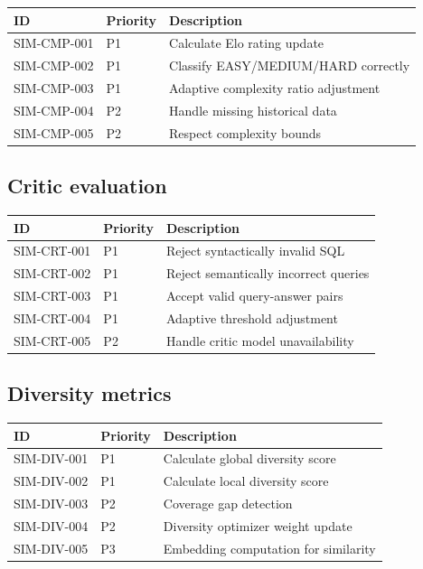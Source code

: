 \begin{tabularx}{\linewidth}{@{}l l X@{}}
\toprule
\textbf{ID} & \textbf{Priority} & \textbf{Description} \\ \midrule
SIM-CMP-001 & P1 & Calculate Elo rating update \\
SIM-CMP-002 & P1 & Classify EASY/MEDIUM/HARD correctly \\
SIM-CMP-003 & P1 & Adaptive complexity ratio adjustment \\
SIM-CMP-004 & P2 & Handle missing historical data \\
SIM-CMP-005 & P2 & Respect complexity bounds \\
\bottomrule
\end{tabularx}

\subsection{Critic evaluation}

\begin{tabularx}{\linewidth}{@{}l l X@{}}
\toprule
\textbf{ID} & \textbf{Priority} & \textbf{Description} \\ \midrule
SIM-CRT-001 & P1 & Reject syntactically invalid SQL \\
SIM-CRT-002 & P1 & Reject semantically incorrect queries \\
SIM-CRT-003 & P1 & Accept valid query-answer pairs \\
SIM-CRT-004 & P1 & Adaptive threshold adjustment \\
SIM-CRT-005 & P2 & Handle critic model unavailability \\
\bottomrule
\end{tabularx}

\subsection{Diversity metrics}

\begin{tabularx}{\linewidth}{@{}l l X@{}}
\toprule
\textbf{ID} & \textbf{Priority} & \textbf{Description} \\ \midrule
SIM-DIV-001 & P1 & Calculate global diversity score \\
SIM-DIV-002 & P1 & Calculate local diversity score \\
SIM-DIV-003 & P2 & Coverage gap detection \\
SIM-DIV-004 & P2 & Diversity optimizer weight update \\
SIM-DIV-005 & P3 & Embedding computation for similarity \\
\bottomrule
\end{tabularx}

